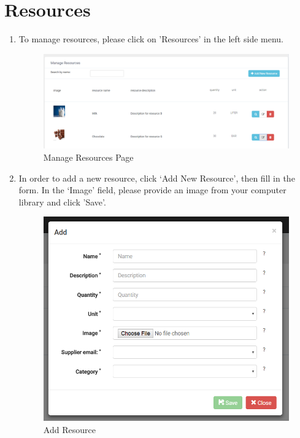 \documentclass[a4paper,11pt,twoside]{report}
\theoremstyle{definition}
\begin{document}
\section{Resources}
\begin{enumerate}
\item To manage resources, please click on 'Resources' in the left side menu. 
\begin{figure}[h!]
\begin{center}
\includegraphics[width=\textwidth]{AS/resources/1}
\end{center}
\caption{Manage Resources Page}
\end{figure}
\thispagestyle{empty}
\item In order to add a new resource, click ‘Add New Resource’, then fill in the form. In the ‘Image’ field, please provide an image from your computer library and click 'Save'.

\begin{figure}[h!]
\begin{center}
\includegraphics[width=\textwidth]{AS/resources/2}
\end{center}
\caption{Add Resource}
\end{figure}
\thispagestyle{empty}


\end{enumerate}
\end{document}
